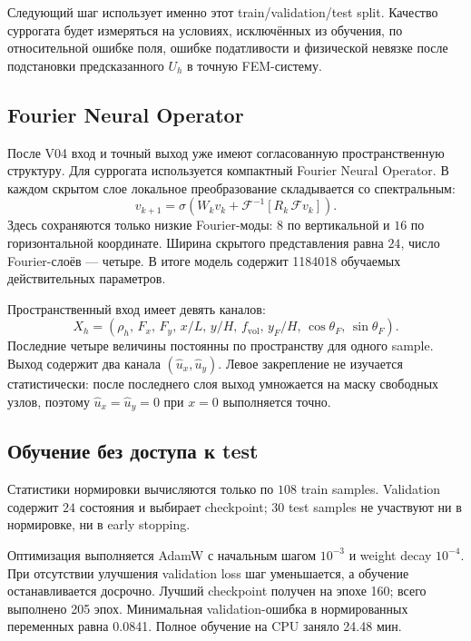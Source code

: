 Следующий шаг использует именно этот train/validation/test split. Качество суррогата будет измеряться на условиях, исключённых из обучения, по относительной ошибке поля, ошибке податливости и физической невязке после подстановки предсказанного $U_h$ в точную FEM-систему.

\subsection{Fourier Neural Operator}
\label{subsec:practical-v05-fno}

После V04 вход и точный выход уже имеют согласованную пространственную структуру. Для суррогата используется компактный Fourier Neural Operator. В каждом скрытом слое локальное преобразование складывается со спектральным:
\begin{equation}
\label{eq:practical-v05-fno-layer}
 v_{k+1}
 =
 \sigma\!\left(
 W_k v_k
 +
 \mathcal{F}^{-1}
 \!\left[
 R_k\,\mathcal{F}v_k
 \right]
 \right).
\end{equation}
Здесь сохраняются только низкие Fourier-моды: $8$ по вертикальной и $16$ по горизонтальной координате. Ширина скрытого представления равна $24$, число Fourier-слоёв --- четыре. В итоге модель содержит 1184018 обучаемых действительных параметров.

Пространственный вход имеет девять каналов:
\begin{equation}
\label{eq:practical-v05-input}
 X_h=
 \left(
 \rho_h,\,
 F_x,\,
 F_y,\,
 x/L,\,
 y/H,\,
 f_{\mathrm{vol}},\,
 y_F/H,\,
 \cos\theta_F,\,
 \sin\theta_F
 \right).
\end{equation}
Последние четыре величины постоянны по пространству для одного sample. Выход содержит два канала $(\widehat u_x,\widehat u_y)$. Левое закрепление не изучается статистически: после последнего слоя выход умножается на маску свободных узлов, поэтому $\widehat u_x=\widehat u_y=0$ при $x=0$ выполняется точно.

\subsection{Обучение без доступа к test}
\label{subsec:practical-v05-training}

Статистики нормировки вычисляются только по $108$ train samples. Validation содержит $24$ состояния и выбирает checkpoint; $30$ test samples не участвуют ни в нормировке, ни в early stopping.

Оптимизация выполняется AdamW с начальным шагом $10^{-3}$ и weight decay $10^{-4}$. При отсутствии улучшения validation loss шаг уменьшается, а обучение останавливается досрочно. Лучший checkpoint получен на эпохе 160; всего выполнено 205 эпох. Минимальная validation-ошибка в нормированных переменных равна 0.0841. Полное обучение на CPU заняло 24.48 мин.


